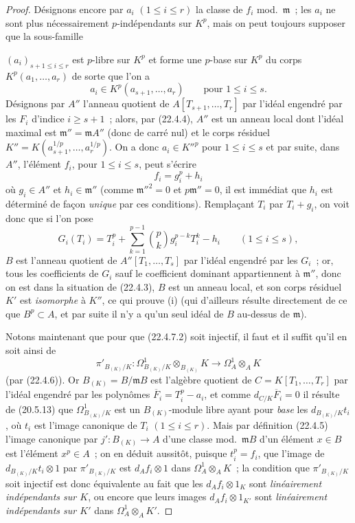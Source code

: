 \begin{proof}
Désignons encore par $a_i$ $(1\leqslant i\leqslant r)$ la classe de $f_i$
mod.~$\mathfrak m$~; les $a_i$ ne sont plus nécessairement $p$-indépendants
sur $K^p$, mais on peut toujours supposer que la sous-famille


$(a_i)_{s+1\leqslant i\leqslant r}$ est $p$-libre sur $K^p$ et forme une
$p$-base sur $K^p$ du corps $K^p(a_1,\ldots,a_r)$ de sorte que l'on a
\[
  a_i\in K^p(a_{s+1},\ldots,a_r)\qquad\text{pour }1\leqslant i\leqslant s.
\]
Désignons par $A''$ l'anneau quotient de $A[T_{s+1},\ldots,T_r]$ par l'idéal
engendré par les $F_i$ d'indice $i\geqslant s+1$~; alors, par (22.4.4), $A''$
est un anneau local dont l'idéal maximal est $\mathfrak m''=\mathfrak mA''$
(donc de carré nul) et le corps résiduel
$K''=K(a_{s+1}^{1/p},\ldots,a_r^{1/p})$. On a donc
$a_i\in K''^p$ pour $1\leqslant i\leqslant s$ et par suite, dans $A''$,
l'élément $f_i$, pour $1\leqslant i\leqslant s$, peut s'écrire
\begin{equation}
\label{0.22.4.7.3-fr}
  f_i=g_i^p+h_i
  \tag{22.4.7.3}
\end{equation}
où $g_i\in A''$ et $h_i\in\mathfrak m''$ (comme $\mathfrak m''^2=0$ et
$p\mathfrak m''=0$, il est immédiat que $h_i$ est déterminé de façon
\emph{unique} par ces conditions). Remplaçant $T_i$ par $T_i+g_i$, on voit donc
que si l'on pose
\[
  G_i(T_i)=T_i^p+\sum_{k=1}^{p-1}\binom pk g_i^{p-k}T_i^k-h_i
  \qquad(1\leqslant i\leqslant s),
\]
$B$ est l'anneau quotient de $A''[T_1,\ldots,T_s]$ par l'idéal engendré par les
$G_i$~; or, tous les coefficients de $G_i$ sauf le coefficient dominant
appartiennent à $\mathfrak m''$, donc on est dans la situation de (22.4.3),
$B$ est un anneau local, et son corps résiduel $K'$ est \emph{isomorphe} à
$K''$, ce qui prouve (i) (qui d'ailleurs résulte directement de ce que
$B^p\subset A$, et par suite il n'y a qu'un seul idéal de $B$ au-dessus de
$\mathfrak m$).

Notons maintenant que pour que (22.4.7.2) soit injectif, il faut et il suffit
qu'il en soit ainsi de
\[
  \pi'_{B_{(K)}/K}:\Omega^1_{B_{(K)}/K}\otimes_{B_{(K)}}K
  \longrightarrow\Omega^1_A\otimes_AK
\]
(par (22.4.6)). Or $B_{(K)}=B/\mathfrak mB$ est l'algèbre quotient de
$C=K[T_1,\ldots,T_r]$ par l'idéal engendré par les polynômes
$\overline F_i=T_i^p-a_i$, et comme $d_{C/K}\overline F_i=0$ il résulte de
(20.5.13) que $\Omega^1_{B_{(K)}/K}$ est un $B_{(K)}$-module libre ayant pour
\emph{base} les $d_{B_{(K)}/K}t_i$, où $t_i$ est l'image canonique de $T_i$
$(1\leqslant i\leqslant r)$. Mais par définition (22.4.5) l'image canonique par
$j':B_{(K)}\longrightarrow A$ d'une classe mod.~$\mathfrak mB$ d'un élément
$x\in B$ est l'élément $x^p\in A$~; on en déduit aussitôt, puisque $t_i^p=f_i$,
que l'image de $d_{B_{(K)}/K}t_i\otimes1$ par $\pi'_{B_{(K)}/K}$ est
$d_Af_i\otimes1$ dans $\Omega^1_A\otimes_AK$~; la condition que
$\pi'_{B_{(K)}/K}$ soit injectif est donc équivalente au fait que les
$d_Af_i\otimes1_K$ sont \emph{linéairement indépendants sur $K$}, ou encore
que leurs images $d_Af_i\otimes1_{K'}$ sont \emph{linéairement indépendants
sur $K'$} dans $\Omega^1_A\otimes_AK'$.


\end{proof}
